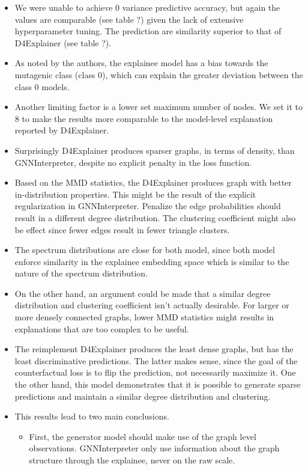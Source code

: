 \documentclass[
  11pt,
  letterpaper,
]{article}
\begin{document}
\begin{itemize}
\item
  We were unable to achieve 0 variance predictive accuracy, but again
  the values are comparable (see table ?) given the lack of extensive
  hyperparameter tuning. The prediction are similarity superior to that
  of D4Explainer (see table ?).
\item
  As noted by the authors, the explainee model has a bias towards the
  mutagenic class (class 0), which can explain the greater deviation
  between the class 0 models.
\item
  Another limiting factor is a lower set maximum number of nodes. We set
  it to 8 to make the results more comparable to the model-level
  explanation reported by D4Explainer.
\item
  Surprisingly D4Explainer produces sparser graphs, in terms of density,
  than GNNInterpreter, despite no explicit penalty in the loss function.
\item
  Based on the MMD statistics, the D4Explainer produces graph with
  better in-distribution properties. This might be the result of the
  explicit regularization in GNNInterpreter. Penalize the edge
  probabilities should result in a different degree distribution. The
  clustering coefficient might also be effect since fewer edges result
  in fewer triangle clusters.
\item
  The spectrum distributions are close for both model, since both model
  enforce similarity in the explainee embedding space which is similar
  to the nature of the spectrum distribution.
\item
  On the other hand, an argument could be made that a similar degree
  distribution and clustering coefficient isn't actually desirable. For
  larger or more densely connected graphs, lower MMD statistics might
  results in explanations that are too complex to be useful.
\item
  The reimplement D4Explainer produces the least dense graphs, but has
  the least discriminative predictions. The latter makes sense, since
  the goal of the counterfactual loss is to flip the prediction, not
  necessarily maximize it. One the other hand, this model demonstrates
  that it is possible to generate sparse predictions and maintain a
  similar degree distribution and clustering.
\item
  This results lead to two main conclusions.

  \begin{itemize}
  \item
    First, the generator model should make use of the graph level
    observations. GNNInterpreter only use information about the graph
    structure through the explainee, never on the raw scale.


\end{itemize}
\end{itemize}
\end{document}
